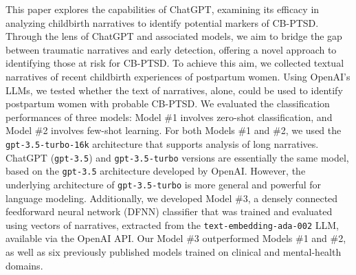 \documentclass[bst/sn-nature]{sn-jnl}%
\theoremstyle{thmstyleone}%
\theoremstyle{thmstyletwo}%
\theoremstyle{thmstylethree}%
\begin{document}
This paper explores the capabilities of ChatGPT, examining its efficacy in analyzing childbirth narratives to identify potential markers of CB-PTSD. 
Through the lens of ChatGPT and associated models, we aim to bridge the gap between traumatic narratives and early detection, offering a novel approach to identifying those at risk for CB-PTSD.
To achieve this aim, we collected textual narratives of recent childbirth experiences of postpartum women.
Using OpenAI's LLMs, we tested whether the text of narratives, alone, could be used to identify postpartum women with probable CB-PTSD.
We evaluated the classification performances of three models:
Model \#1 involves zero-shot classification, and
Model \#2 involves few-shot learning.
For both Models \#1 and \#2, we used the \texttt{gpt-3.5-turbo-16k} architecture that supports analysis of long narratives.
ChatGPT (\texttt{gpt-3.5}) and \texttt{gpt-3.5-turbo} versions are essentially the same model, based on the \texttt{gpt-3.5} architecture developed by OpenAI.
However, the underlying architecture of \texttt{gpt-3.5-turbo} is more general and powerful for language modeling.
Additionally, we developed Model \#3, a densely connected feedforward neural network (DFNN) classifier that was trained and evaluated using vectors of narratives, extracted from the \texttt{text-embedding-ada-002} LLM, available via the OpenAI API.
Our Model \#3 outperformed Models \#1 and \#2, as well as six previously published models trained on clinical and mental-health domains.






\end{document}
